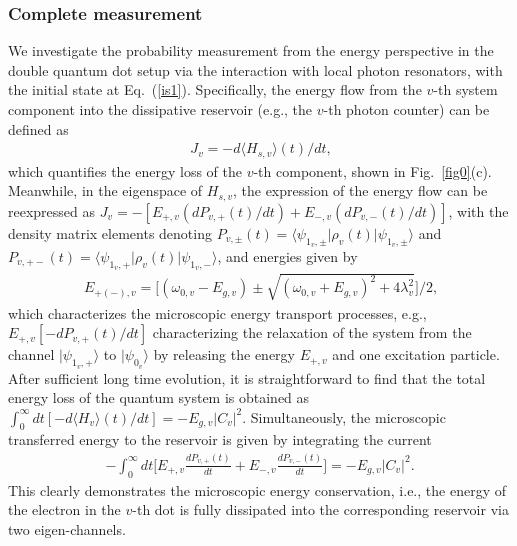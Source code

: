 \documentclass[twocolumn,showpacs,preprintnumbers,amsmath,amssymb]{revtex4}
\begin{document}
	\subsubsection{Complete measurement}
	We investigate the probability measurement from the energy perspective in the double quantum dot setup via the interaction with local photon resonators,
	with the initial state at Eq.~(\ref{is1}).
	Specifically, the energy flow from the $v$-th system component
	into the dissipative reservoir (e.g., the $v$-th photon counter) can be defined as
	\begin{eqnarray}~\label{je1}
		J_{v}=-d{\langle}H_{s,v}{\rangle}(t)/dt,
	\end{eqnarray}
	which quantifies the  energy loss of the $v$-th component, shown in Fig.~\ref{fig0}(c).
	Meanwhile, in the eigenspace of $H_{s,v}$,
	the expression of the energy flow can be reexpressed as
	$J_v=-[E_{+,v}(dP_{v,+}(t)/dt)+E_{-,v}(dP_{v,-}(t)/dt)]$,
	with  the density matrix elements denoting
	$P_{v,\pm}(t)=\langle \psi_{1_v,\pm}\vert \rho_v(t) \vert \psi_{1_v,\pm}\rangle$
	and $P_{v,+-}(t)=\langle \psi_{1_v,+}\vert \rho_v(t) \vert \psi_{1_v,-}\rangle$,
	and energies given by
	\begin{eqnarray}~\label{Epm}
		E_{+(-),v}=\Big[(\omega_{0,v}-E_{g,v}){\pm}
		\sqrt{(\omega_{0,v}+E_{g,v})^2+4\lambda^2_v}\Big]/2,
	\end{eqnarray}
	which characterizes the microscopic energy transport processes, e.g.,
	$E_{+,v}[-dP_{v,+}(t)/dt]$ characterizing the relaxation of the system from
	the channel $|\psi_{1_v,+}{\rangle}$
	to $|\psi_{0_v}{\rangle}$ by releasing the energy $E_{+,v}$ and one excitation particle.
	After sufficient long time evolution,
	it is straightforward to find that the total energy loss of the quantum system is obtained as
	$\int^\infty_0dt[-d{\langle}H_v{\rangle}(t)/dt]
	=-E_{g,v}|C_v|^2$.
	Simultaneously, the microscopic transferred energy to the reservoir
	is given by integrating the current
\begin{eqnarray}	
-\int^\infty_0dt\Big[E_{+,v}\frac{dP_{v,+}(t)}{dt}+E_{-,v}\frac{dP_{v,-}(t)}{dt}\Big]
	=-E_{g,v}|C_v|^2.
\end{eqnarray}
	This clearly demonstrates the microscopic energy conservation, i.e., the energy of the electron
	in the $v$-th dot is fully dissipated into the corresponding reservoir via two eigen-channels.
	
\end{document}
